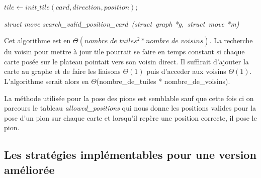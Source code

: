\documentclass[12pt]{article}
\begin{document}
\LinesNumbered
\DontPrintSemicolon
\begin{algorithm}
{$tile \leftarrow init\_tile(card, direction, position);$}\\
\;
\caption{\textit{struct move search\_valid\_position\_card\ (struct\ graph *g,\ struct\ move *m)}} \label{2}
\end{algorithm}

Cet algorithme est en $\Theta({nombre\_de\_tuiles^2} * nombre\_de\_voisins)$. La recherche du voisin pour mettre à jour tile pourrait se faire en temps constant si chaque carte posée sur le plateau pointait vers son voisin direct. Il suffirait d'ajouter la carte au graphe et de faire les liaisons $\Theta(1)$ puis d'acceder aux voisins $\Theta(1)$. L'algorithme serait alors en $\Theta$(nombre\_de\_tuiles * nombre\_de\_voisins).

La méthode utilisée pour la pose des pions est semblable sauf que cette fois ci on parcours le tableau \textit{allowed\_positions} qui nous donne les positions valides pour la pose d'un pion sur chaque carte et lorsqu'il repère une position correcte, il pose le pion.

\subsection{Les stratégies implémentables pour une version améliorée}
\end{document}
